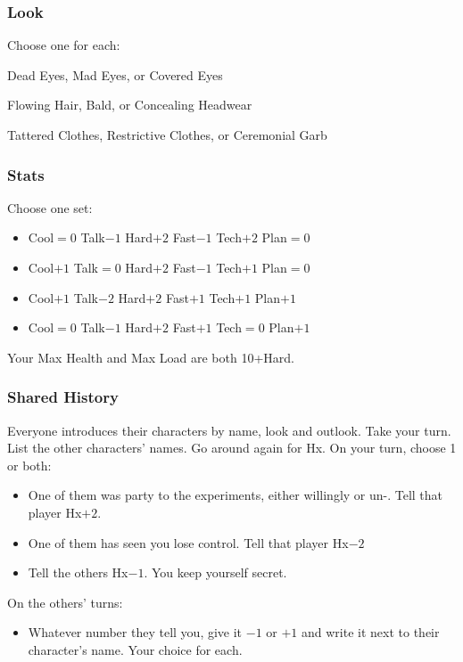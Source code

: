 \subsubsection{Look}
Choose one for each:

Dead Eyes, Mad Eyes, or Covered Eyes

Flowing Hair, Bald, or Concealing Headwear

Tattered Clothes, Restrictive Clothes, or Ceremonial Garb

\subsubsection{Stats}
Choose one set:
\begin{itemize}
\setlength\itemsep{0em}
\item Cool${=}0$ Talk$-1$ Hard$+2$ Fast$-1$ Tech$+2$ Plan${=}0$
\item Cool$+1$ Talk${=}0$ Hard$+2$ Fast$-1$ Tech$+1$ Plan${=}0$
\item Cool$+1$ Talk$-2$ Hard$+2$ Fast$+1$ Tech$+1$ Plan$+1$
\item Cool${=}0$ Talk$-1$ Hard$+2$ Fast$+1$ Tech${=}0$ Plan$+1$
\end{itemize}
Your Max Health and Max Load are both 10+Hard.

\subsubsection{Shared History}
Everyone introduces their characters by name, look and outlook. Take
your turn. List the other characters' names. Go around again for
Hx. On your turn, choose 1 or both:
\begin{itemize} %
\item One of them was party to the experiments, either willingly or un-. Tell that player Hx$+2$.
\item One of them has seen you lose control. Tell that player Hx$-2$
\item Tell the others Hx$-1$. You keep yourself secret.
\end{itemize}
On the others’ turns:
\begin{itemize} %
\item Whatever number they tell you, give it $-1$ or $+1$ and write it
  next to their character’s name. Your choice for each.
\end{itemize}

